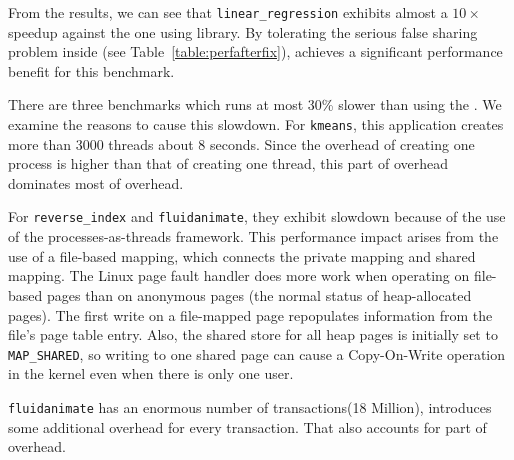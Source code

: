 From the results, we can see that \texttt{linear\_regression} exhibits almost a $10\times$ speedup against the one using \pthreads{} library. By tolerating the serious false sharing problem inside (see Table~\ref{table:perfafterfix}), \sheriffprotect{} achieves a significant performance benefit for this benchmark.

There are three benchmarks which runs at most 30\% slower than using the \pthreads{}. We examine the reasons to cause this slowdown. For \texttt{kmeans}, this application creates more than 3000 threads about 8 seconds. Since the overhead of creating one process is higher than that of creating one thread, this part of overhead dominates most of overhead. 

For \texttt{reverse\_index} and \texttt{fluidanimate}, 
they exhibit slowdown because of the use of the processes-as-threads framework. This performance impact arises from the use of a file-based mapping, which connects the private mapping and shared mapping. The Linux page fault handler does more work when operating on file-based pages than on anonymous pages (the normal status of heap-allocated pages). The first write on a file-mapped page repopulates information from the file's page table entry. Also, the shared store for all heap pages is initially set to \texttt{MAP\_SHARED}, so writing to one shared page can cause a Copy-On-Write operation in the kernel even when there is only one user. 

\texttt{fluidanimate} has an enormous number of transactions(18 Million), \sheriffprotect{} 
introduces some additional overhead for every transaction. That also accounts for part of
overhead.
